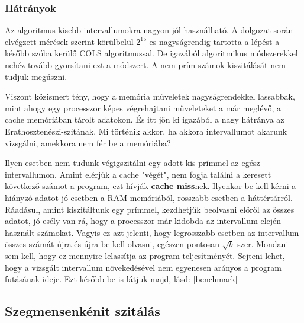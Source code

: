 \documentclass[twoside, a4paper, 12pt]{article}
\begin{document}
 \subsubsection{Hátrányok} \label{badbad}
Az algoritmus kisebb intervallumokra nagyon jól használható. A dolgozat során elvégzett mérések szerint körülbelül $2^{15}$-es nagyságrendig tartotta a lépést a később szóba kerülő COLS algoritmussal. De igazából algoritmikus módszerekkel nehéz tovább gyorsítani ezt a módszert. A nem prím számok kiszitálását nem tudjuk megúszni. \par
Viszont közismert tény, hogy a memória műveletek nagyságrendekkel lassabbak, mint ahogy egy processzor képes végrehajtani műveleteket a már meglévő, a cache memóriában tárolt adatokon. És itt jön ki igazából a nagy hátránya az Erathosztenészi-szitának. Mi történik akkor, ha akkora intervallumot akarunk vizsgálni, amekkora nem fér be a memóriába? \par
Ilyen esetben nem tudunk végigszitálni egy adott kis prímmel az egész intervallumon. Amint elérjük a cache "végét", nem fogja találni a keresett következő számot a program, ezt hívják \textbf{cache miss}nek. Ilyenkor be kell kérni a hiányzó adatot jó esetben a RAM memóriából, rosszabb esetben a háttértárról. Ráadásul, amint kiszitáltunk egy prímmel, kezdhetjük beolvasni előről az összes adatot, jó esély van rá, hogy a processzor már kidobda az intervallum elején használt számokat. Vagyis ez azt jelenti, hogy legrosszabb esetben az intervallum összes számát újra és újra be kell olvasni, egészen pontosan $\sqrt{b}$-szer. Mondani sem kell, hogy ez mennyire lelassítja az program teljesítményét. Sejteni lehet, hogy a vizsgált intervallum növekedésével nem egyenesen arányos a program futásának ideje. Ezt később be is látjuk majd, lásd: \ref{benchmark}

\subsection{Szegmensenkénit szitálás} \cite{COLS}
\end{document}
